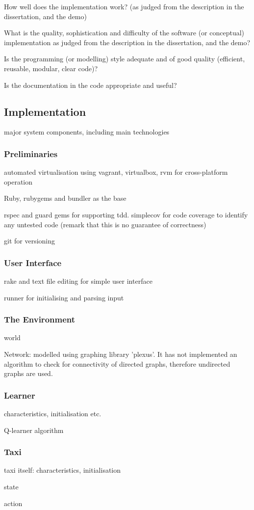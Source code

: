 How well does the implementation work? (as judged from the description in the
dissertation, and the demo)

What is the quality, sophistication and difficulty of the software (or
conceptual) implementation as judged from the description in the dissertation,
and the demo?

Is the programming (or modelling) style adequate and of good quality
(efficient, reusable, modular, clear code)?

Is the documentation in the code appropriate and useful?


\subsection{Implementation}

major system components, including main technologies



\subsubsection{Preliminaries}

automated virtualisation using vagrant, virtualbox, rvm for cross-platform
operation

Ruby, rubygems and bundler as the base

rspec and guard gems for supporting tdd. simplecov for code coverage to
identify any untested code (remark that this is no guarantee of correctness)

git for versioning


\subsubsection{User Interface}

rake and text file editing for simple user interface

runner for initialising and parsing input 


\subsubsection{The Environment}

world

Network: modelled using graphing library 'plexus'. It has not implemented an
algorithm to check for connectivity of directed graphs, therefore undirected
graphs are used.


\subsubsection{Learner}

characteristics, initialisation etc.

Q-learner algorithm


\subsubsection{Taxi}

taxi itself: characteristics, initialisation

state

action
